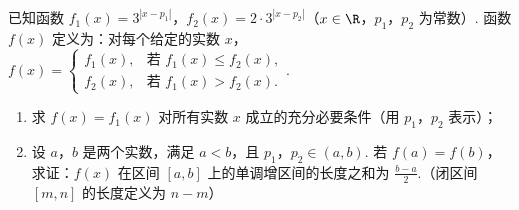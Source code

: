 \begin{problem}
已知函数 \(f_1(x) = 3^{|x-p_1|}\)，\(f_2(x) = 2 \cdot 3^{|x-p_2|}\)（\(x \in \R\)，\(p_1\)，\(p_2\) 为常数）. 函数 \(f(x)\) 定义为：对每个给定的实数 \(x\)，\(f(x) = \begin{cases}
f_1(x), & \text{若\ } f_1(x) \leqslant f_2(x),\\
f_2(x), & \text{若\ } f_1(x) > f_2(x).
\end{cases}\).

\begin{enumerate}
\item 求 \(f(x) = f_1(x)\) 对所有实数 \(x\) 成立的充分必要条件（用 \(p_1\)，\(p_2\) 表示）；
\item 设 \(a\)，\(b\) 是两个实数，满足 \(a < b\)，且 \(p_1\)，\(p_2 \in (a, b)\). 若 \(f(a) = f(b)\)，求证：\(f(x)\) 在区间 \([a, b]\) 上的单调增区间的长度之和为 \(\frac{b-a}{2}\).（闭区间 \([m, n]\) 的长度定义为 \(n-m\)）
\end{enumerate}
\end{problem}

